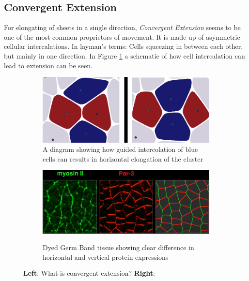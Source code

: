 \subsection{Convergent Extension}
\label{sec:ConvergentExtension}
For elongating of sheets in a single direction, \textit{Convergent Extension} seems to be one of the most common proprietors of movement. It is made up of asymmetric cellular intercalations. In layman's terms: Cells squeezing in between each other, but mainly in one direction. 
In Figure  \ref{fig:cellIntercolation} a schematic of how cell intercalation can lead to extension can be seen.
\begin{figure}[H]
    \centering
    \begin{subfigure}{0.45\linewidth}
        \centering
    \includegraphics[width=\linewidth]{chapters/Theory/figures/ConvergentExtensionDiagram.png}
    \caption{A diagram showing how guided intercolation of blue cells can results in horizontal elongation of the cluster}
    \label{fig:cellIntercolation}
    \end{subfigure}
        \begin{subfigure}{0.45\linewidth}
        \centering
        \caption{Dyed Germ Band tissue showing clear difference in horizontal and vertical protein expressions}
    \includegraphics[width=\linewidth]{chapters/Theory/figures/bipolar-PCP.png}
    \label{fig:dyedDifferentialWall}
    \end{subfigure}
    \caption{\textbf{Left}: What is convergent extension? \textbf{Right}: }
    
    \label{fig:ConvergentExtensionDiagram}
\end{figure}

